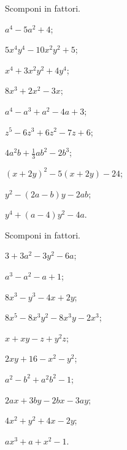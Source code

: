 \begin{esercizio}[\Ast]
 \label{ese:13.115}
 Scomponi in fattori.
 \begin{multicols}{2}
 \begin{enumeratea}
\item $a^{4}-5a^{2}+4$;
\item $5x^{4}y^{4}-10x^{2}y^{2}+5$;
\item $x^{4}+3x^{2}y^{2}+4y^{4}$;
\item $8x^{3}+2x^{2}-3x$;
\item $a^{4}-a^{3}+a^{2}-4a+3$;
\item $z^{5}-6z^{3}+6z^{2}-7z+6$;
\item $4a^{2}b+\frac{1}{3}ab^{2}-2b^{3}$;
\item $(x+2y)^{2}-5(x+2y)-24$;
\item $y^{2}-(2a-b)y-2ab$;
\item $y^{4}+(a-4)y^{2}-4a$.
 \end{enumeratea}
 \end{multicols}
\end{esercizio}
\pagebreak
\begin{esercizio}[\Ast]
 \label{ese:13.116}
 Scomponi in fattori.
 \begin{multicols}{2}
 \begin{enumeratea}
\item $3+3a^{2}-3y^{2}-6a$;
\item $a^{3}-a^{2}-a+1$;
\item $8x^{3}-y^{3}-4x+2y$;
\item $8x^{5}-8x^{3}y^{2}-8x^{3}y-2x^{3}$;
\item $x+xy-z+y^{2}z$;
\item $2xy+16-x^{2}-y^{2}$;
\item $a^{2}-b^{2}+a^{2}b^{2}-1$;
\item $2ax+3by-2bx-3ay$;
\item $4x^{2}+y^{2}+4x-2y$;
\item $ax^{3}+a+x^{2}-1$.
 \end{enumeratea}
 \end{multicols}
\end{esercizio}

